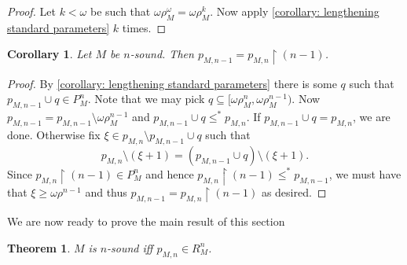 \documentclass[12pt,a4paper]{article}
\theoremstyle{nicestyle}
\newtheorem{theorem}{Theorem}[subsection]
\newtheorem{corollary}{Corollary}[subsection]
\begin{document}
  \begin{proof}
    Let $k < \omega$ be such that
    $\omega\rho_{M}^{\omega} = \omega \rho_{M}^{k}$. Now apply
    \autoref{corollary: lengthening standard parameters} $k$
    times.
  \end{proof}

  \begin{corollary}
    Let $M$ be $n$-sound. Then
    $p_{M, n-1} = p_{M,n} \restriction (n-1)$.
  \end{corollary}

  \begin{proof}
    By \autoref{corollary: lengthening standard parameters} there is
    some $q$ such that $p_{M, n-1} \cup q \in P^{n}_{M}$. Note that we
    may pick $q \subseteq [\omega\rho^{n}_{M},
    \omega\rho^{n-1}_{M})$. Now
    $p_{M, n-1} = p_{M, n-1} \setminus \omega\rho^{n-1}_{M}$ and
    $p_{M, n-1} \cup q \le^{*} p_{M,n}$. If
    $p_{M, n-1} \cup q = p_{M,n}$, we are done. Otherwise fix
    $\xi \in p_{M,n} \setminus p_{M, n-1} \cup q$ such that
    \[
      p_{M,n} \setminus (\xi + 1) = (p_{M, n-1} \cup q) \setminus (\xi
      + 1).
    \]
    Since $p_{M,n} \restriction (n-1) \in P^{n}_{M}$ and hence
    $p_{M,n} \restriction (n-1) \le^{*} p_{M, n-1}$, we must have that
    $\xi \ge \omega\rho^{n-1}$ and thus
    $p_{M, n-1} = p_{M,n} \restriction (n-1)$ as desired.
  \end{proof}
  
  We are now ready to prove the main result of this section

  \begin{theorem} \label{theorem: characterization of n-soundness}
    $M$ is $n$-sound iff $p_{M,n} \in R^{n}_{M}$.
  \end{theorem}
\end{document}
